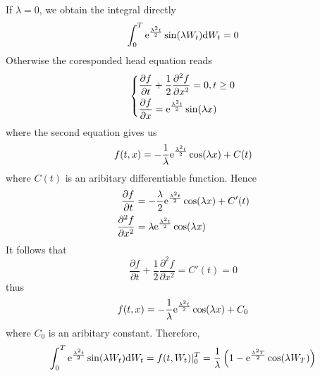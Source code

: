 \documentclass{homework}
\begin{document}
\begin{subproblem}[(\alph*)]
        \item
        If $\lambda=0$, we obtain the integral directly
        \renewcommand{\thisf}[1]{\e^{\frac{\lambda^2t}2}\sin(\lambda #1)}
        \[\int_0^T\thisf{W_t}\diff W_t=0\]
        Otherwise the coresponded head equation reads
        \[\left\{\begin{aligned}
            &\frac{\partial f}{\partial t}+\frac{1}{2}\frac{\partial^2 f}{\partial x^2}=0,t\geq 0\\
            &\frac{\partial f}{\partial x}=\thisf{x}
        \end{aligned}\right.\]
        where the second equation gives us
        \[f(t,x)=-\frac{1}{\lambda}\mathrm e^{\frac{\lambda^2t}{2}}\cos(\lambda x)+C(t)\]
        where $C(t)$ is an aribitary differentiable function. Hence
        \[\begin{aligned}
            \frac{\partial f}{\partial t}&=-\frac{\lambda}{2}
            \mathrm e^{\frac{\lambda^2t}{2}}\cos(\lambda x)+C'(t)\\
            \frac{\partial^2f}{\partial x^2}&=\lambda\mathrm e^{\frac{\lambda^2t}{2}}\cos(\lambda x)
        \end{aligned}\]
        It follows that
        \[\frac{\partial f}{\partial t}+\frac{1}{2}\frac{\partial^2 f}{\partial x^2}
        =C'(t)=0\]
        thus
        \[f(t,x)=-\frac{1}{\lambda}\mathrm e^{\frac{\lambda^2t}{2}}\cos(\lambda x)+C_0\]
        where $C_0$ is an aribitary constant. Therefore,
        \[\int_0^T\thisf{W_t}\diff W_t=f(t,W_t)|_0^T
        =\frac{1}{\lambda}\left(1-\e^{\frac{\lambda^2T}{2}}\cos(\lambda W_T)\right)\]
    \end{subproblem}
\end{document}
